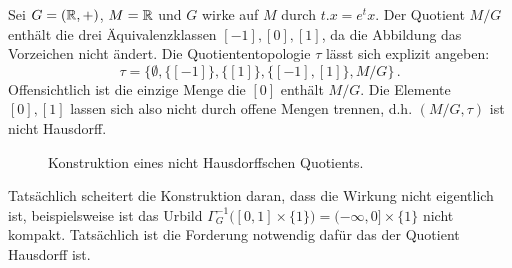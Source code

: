 \begin{beispiel}
Sei $G=(\mathbb{R},+)$, $M=\mathbb{R}$ und $G$ wirke auf $M$ durch $t.x=e^tx$.
Der Quotient $M/G$ enthält die drei Äquivalenzklassen $[-1],[0],[1]$, da die
Abbildung das Vorzeichen nicht ändert.
Die Quotiententopologie $\tau$ lässt sich explizit angeben:
 \begin{equation}
 \tau =\big\{\emptyset,\{[-1]\},\{[1]\},\{[-1],[1]\},M/G\big\}\,.
 \end{equation} 
 Offensichtlich ist die einzige Menge die $[0]$ enthält $M/G$. Die Elemente
 $[0],[1]$ lassen sich also nicht durch offene Mengen trennen, d.h. $(M/G,\tau)$
 ist nicht Hausdorff.
 \begin{figure}
\centering
{}
\caption{Konstruktion eines nicht Hausdorffschen Quotients.}
\end{figure}
\end{beispiel} 
Tatsächlich scheitert die Konstruktion daran, dass die Wirkung nicht eigentlich
ist, beispielsweise ist das Urbild $\Gamma_G^{-1}\big([0,1]\times
\{1\}\big)=(-\infty,0]\times \{1\}$ nicht kompakt.
Tatsächlich ist die Forderung notwendig dafür das der Quotient Hausdorff ist.

